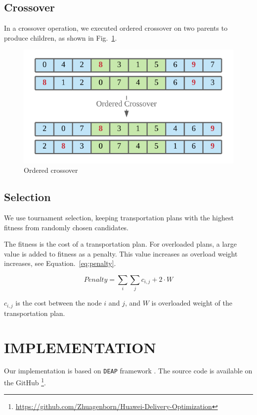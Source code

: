 \documentclass[runningheads]{llncs}
\begin{document}
\subsection{Crossover}
In a crossover operation, we executed ordered crossover on two parents to produce children, as shown in Fig.~\ref{fig:crossover}.

\begin{figure}[htbp]
    \centerline{\includegraphics[width=0.8\linewidth]{figures/crossover.png}}
    \caption{Ordered crossover}
    \label{fig:crossover}
\end{figure}

\subsection{Selection}
We use tournament selection, keeping transportation plans with the highest fitness from randomly chosen candidates.

The fitness is the cost of a transportation plan.
For overloaded plans, a large value is added to fitness as a penalty. This value increases as overload weight increases, see Equation.~\ref{eq:penalty}.

\begin{equation}
    Penalty = \sum_{i}\sum_{j}c_{i, j} + 2 \cdot W
    \label{eq:penalty}
\end{equation}

$c_{i, j}$ is the cost between the node $i$ and $j$, and $W$ is overloaded weight of the transportation plan.


\section{IMPLEMENTATION}
Our implementation is based on \verb|DEAP| framework \cite{deap}.
The source code is available on the GitHub \footnote{\url{https://github.com/Zhuagenborn/Huawei-Delivery-Optimization}}.




\end{document}
